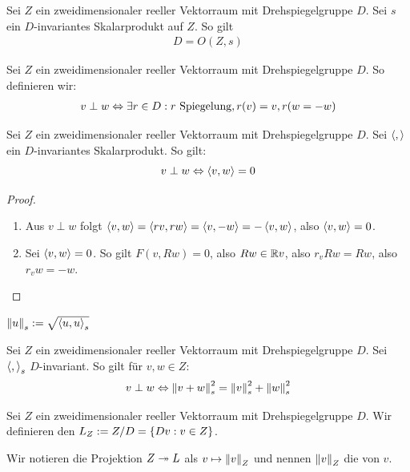 \documentclass{report}
\begin{document}
\begin{theorem}
	Sei $Z$ ein zweidimensionaler reeller Vektorraum mit Drehspiegelgruppe $D$. Sei $s$ ein $D$-invariantes Skalarprodukt auf $Z$. So gilt
	\begin{align*}
		D = O(Z,s)
	\end{align*}
\end{theorem}
\begin{definition}
	Sei $Z$ ein zweidimensionaler reeller Vektorraum mit Drehspiegelgruppe $D$. So definieren wir:
	\begin{align*}
		v \perp w \Leftrightarrow  \exists r \in D : r \textnormal{ Spiegelung}, r(v) = v, r(w = -w)
	\end{align*}
\end{definition}
\begin{theorem}
	Sei $Z$ ein zweidimensionaler reeller Vektorraum mit Drehspiegelgruppe $D$. Sei $\left\langle ,  \right\rangle$ ein $D$-invariantes Skalarprodukt. So gilt:
	$$v \perp w \Leftrightarrow \left\langle v, w \right\rangle = 0$$
\end{theorem}
\begin{proof}
	\begin{enumerate}
		\item[$\Longrightarrow$:] Aus $v \perp w$ folgt $\left\langle v, w \right\rangle = \left\langle rv, rw \right\rangle = \left\langle v, -w \right\rangle = -\left\langle v, w \right\rangle$, also $\left\langle v, w \right\rangle = 0$.
		\item[$\Longleftarrow$:] Sei $\left\langle v, w \right\rangle = 0$. So gilt $F(v,Rw) = 0$, also $Rw \in \mathbb{R} v$, also $r_v R w = Rw$, also $r_vw = -w$.
	\end{enumerate}
\end{proof}
\begin{definition}
	$\norm{u}_s := \sqrt{\left\langle u, u \right\rangle_s}$
\end{definition}
\begin{theorem}
	 Sei $Z$ ein zweidimensionaler reeller Vektorraum mit Drehspiegelgruppe $D$. Sei $\left\langle ,  \right\rangle_s$ $D$-invariant. So gilt für $v,w \in Z$:
	\begin{align*}
		v \perp w \Leftrightarrow \norm{v + w}_s^2 = \norm{v}_s^2 + \norm{w}_s^2
	\end{align*}
\end{theorem}
\begin{definition}
	Sei $Z$ ein zweidimensionaler reeller Vektorraum mit Drehspiegelgruppe $D$. Wir definieren den  $L_Z := Z/D = \qty{Dv : v \in Z}$. 
\end{definition}
\begin{definition}
	Wir notieren die Projektion $Z \twoheadrightarrow L$ als $v \mapsto \norm{v}_Z$ und nennen $\norm{v}_Z$ die  von $v$.
\end{definition}
\end{document}
